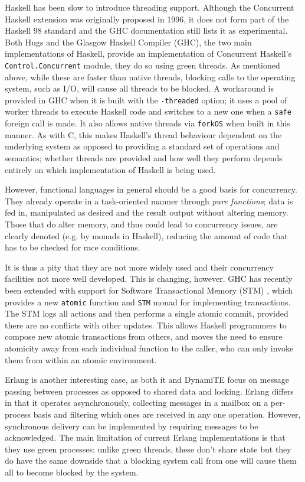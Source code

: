 Haskell has been slow to introduce threading support.  Although the
Concurrent Haskell\cite{conchaskell} extension was originally proposed
in 1996, it does not form part of the Haskell 98 standard and the GHC
documentation still lists it as experimental.  Both Hugs and the
Glasgow Haskell Compiler (GHC), the two main implementations of
Haskell, provide an implementation of Concurrent Haskell's
\texttt{Control.Concurrent} module, they do so using green threads.
As mentioned above, while these are faster than native threads,
blocking calls to the operating system, such as I/O, will cause all
threads to be blocked.  A workaround is provided in GHC when it is
built with the \texttt{-threaded} option; it uses a pool of worker
threads to execute Haskell code and switches to a new one when a
\texttt{safe} foreign call is made.  It also allows native threads via
\texttt{forkOS} when built in this manner.  As with C, this makes
Haskell's thread behaviour dependent on the underlying system as
opposed to providing a standard set of operations and semantics;
whether threads are provided and how well they perform depends
entirely on which implementation of Haskell is being used.

However, functional languages in general should be a good basis for
concurrency.  They already operate in a task-oriented manner through
\emph{pure functions}; data is fed in, manipulated as desired and the
result output without altering memory.  Those that do alter memory,
and thus could lead to concurrency issues, are clearly denoted
(e.g. by monads in Haskell), reducing the amount of code that has to
be checked for race conditions.

It is thus a pity that they are not more widely used and their
concurrency facilities not more well developed.  This is changing,
however.  GHC has recently been extended with support for Software
Transactional Memory (STM) \cite{haskellstm}, which provides a new
\texttt{atomic} function and \texttt{STM} monad for implementing
transactions.  The STM logs all actions and then performs a single
atomic commit, provided there are no conflicts with other updates.
This allows Haskell programmers to compose new atomic transactions
from others, and moves the need to ensure atomicity away from each
individual function to the caller, who can only invoke them from
within an atomic environment.

Erlang\cite{erlang} is another interesting case, as both it and
DynamiTE focus on message passing between processes as opposed to
shared data and locking.  Erlang differs in that it operates
asynchronously, collecting messages in a mailbox on a per-process
basis and filtering which ones are received in any one operation.
However, synchronous delivery can be implemented by requiring messages
to be acknowledged.  The main limitation of current Erlang
implementations is that they use green processes; unlike green
threads, these don't share state but they do have the same downside
that a blocking system call from one will cause them all to become
blocked by the system.

